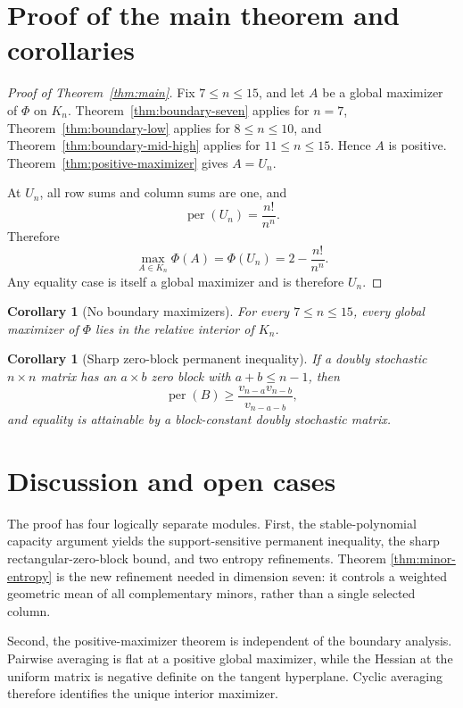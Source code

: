 \documentclass[11pt]{article}
\newtheorem{corollary}[theorem]{Corollary}
\theoremstyle{definition}
\newcommand{\per}{\operatorname{per}}
\newcommand{\1}{\mathbf{1}}
\begin{document}
\section{Proof of the main theorem and corollaries}\label{sec:completion}

\begin{proof}[Proof of Theorem~\ref{thm:main}]
Fix $7\le n\le15$, and let $A$ be a global maximizer of $\Phi$ on $K_n$.  Theorem~\ref{thm:boundary-seven} applies for $n=7$, Theorem~\ref{thm:boundary-low} applies for $8\le n\le10$, and Theorem~\ref{thm:boundary-mid-high} applies for $11\le n\le15$.  Hence $A$ is positive.  Theorem~\ref{thm:positive-maximizer} gives $A=U_n$.

At $U_n$, all row sums and column sums are one, and
\[
 \per(U_n)=\frac{n!}{n^n}.
\]
Therefore
\[
 \max_{A\in K_n}\Phi(A)
 =\Phi(U_n)
 =2-\frac{n!}{n^n}.
\]
Any equality case is itself a global maximizer and is therefore $U_n$.
\end{proof}

\begin{corollary}[No boundary maximizers]\label{cor:no-boundary}
For every $7\le n\le15$, every global maximizer of $\Phi$ lies in the relative interior of $K_n$.
\end{corollary}

\begin{corollary}[Sharp zero-block permanent inequality]\label{cor:sharp-block-restated}
If a doubly stochastic $n\times n$ matrix has an $a\times b$ zero block with $a+b\le n-1$, then
\[
 \per(B)\ge\frac{v_{n-a}v_{n-b}}{v_{n-a-b}},
\]
and equality is attainable by a block-constant doubly stochastic matrix.
\end{corollary}

\section{Discussion and open cases}\label{sec:discussion}

The proof has four logically separate modules.  First, the stable-polynomial
capacity argument yields the support-sensitive permanent inequality, the
sharp rectangular-zero-block bound, and two entropy refinements.  Theorem
\ref{thm:minor-entropy} is the new refinement needed in dimension seven: it
controls a weighted geometric mean of all complementary minors, rather than a
single selected column.

Second, the positive-maximizer theorem is independent of the boundary
analysis.  Pairwise averaging is flat at a positive global maximizer, while
the Hessian at the uniform matrix is negative definite on the tangent
hyperplane.  Cyclic averaging therefore identifies the unique interior
maximizer.
\end{document}
